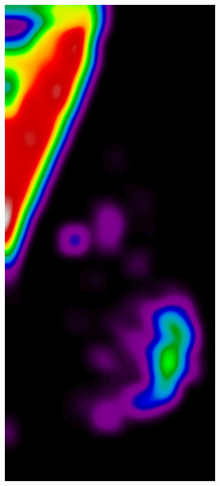 \documentclass{beamer}
\begin{document}
\begin{frame}
\begin{figure}
\begin{subfigure}{0.134\textwidth}
            \end{subfigure}
            \begin{subfigure}{0.134\textwidth}
	            \centering
		            \includegraphics[width=\textwidth]{plots/examples/example4_probs_1_3.png}

\end{subfigure}
\end{figure}
\end{frame}
\end{document}
